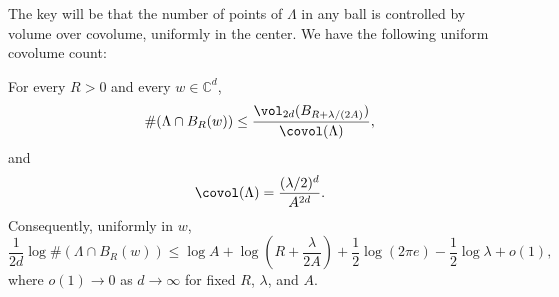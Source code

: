 The key will be that the number of points of $\Lambda$ in any ball is controlled by volume over covolume, uniformly in the center.  We have the following uniform covolume count:
\begin{proposition}\label{prop:covolume-count}
For every $R>0$ and every $w\in\mathbb{C}^d$,
\begin{equation}\label{eq:uniform-count}
   \#(\Lambda\cap B_R(w))
   \leq
   \frac{\vol_{2d}(B_{R+\lambda/(2A)})}{\covol(\Lambda)},
\end{equation}
and
\begin{equation}\label{eq:covol}
   \covol(\Lambda)=\frac{(\lambda/2)^d}{A^{2d}}.
\end{equation}
Consequently, uniformly in $w$,
\begin{equation}\label{eq:size-denom}
  \frac1{2d}\log\#(\Lambda\cap B_R(w))
  \leq
  \log A+\log\left(R+\frac{\lambda}{2A}\right)
  +\frac12\log(2\pi e)-\frac12\log\lambda+o(1),
\end{equation}
where $o(1)\to0$ as $d\to\infty$ for fixed $R$, $\lambda$, and $A$.
\end{proposition}

